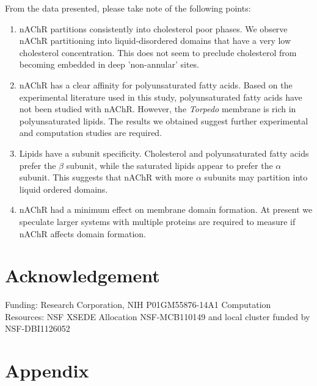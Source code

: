 \documentclass[10pt, letterpaper]{article}
\begin{document}
From the data presented, please take note of the following points:
\begin{enumerate}

  \item nAChR partitions consistently into cholesterol poor phases. We observe nAChR partitioning into liquid-disordered domains that have a very low cholesterol concentration. This does not seem to preclude cholesterol from becoming embedded in deep 'non-annular' sites.  
  
  \item nAChR has a clear affinity for polyunsaturated fatty acids. Based on the experimental literature used in this study, polyunsaturated fatty acids have not been studied with nAChR. However, the \textit{Torpedo} membrane is rich in polyunsaturated lipids. The results we obtained suggest further experimental and computation studies are required. 
  
  \item Lipids have a subunit specificity. Cholesterol and polyunsaturated fatty acids prefer the $\beta$ subunit, while the saturated lipids appear to prefer the $\alpha$ subunit. This suggests that nAChR with more $\alpha$ subunits may partition into liquid ordered domains.
  
  \item nAChR had a minimum effect on membrane domain formation. At present we speculate larger systems with multiple proteins are required to measure if nAChR affects domain formation.
  
\end{enumerate}

\newpage
\section{Acknowledgement}
Funding: Research Corporation, NIH P01GM55876-14A1
Computation Resources: NSF XSEDE Allocation NSF-MCB110149 and local cluster funded by NSF-DBI1126052
\newpage
\section{Appendix}
\end{document}

